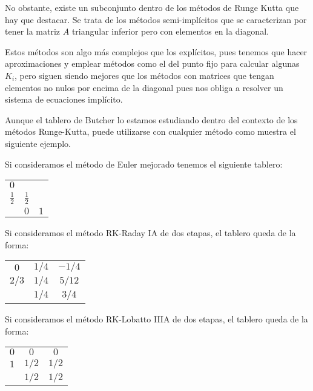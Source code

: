 No obstante, existe un subconjunto dentro de los métodos de Runge Kutta que hay que destacar. Se trata de los métodos semi-implícitos que se caracterizan por tener la matriz $A$ triangular inferior pero con elementos en la diagonal.

Estos métodos son algo más complejos que los explícitos, pues tenemos que hacer aproximaciones y emplear métodos como el del punto fijo para calcular algunas $K_i$, pero siguen siendo mejores que los métodos con matrices que tengan elementos no nulos por encima de la diagonal pues nos obliga a resolver un sistema de ecuaciones implícito.

Aunque el tablero de Butcher lo estamos estudiando dentro del contexto de los métodos Runge-Kutta, puede utilizarse con cualquier método como muestra el siguiente ejemplo.

\begin{example}
Si consideramos el método de Euler mejorado tenemos el siguiente tablero:

\begin{center}
\begin{tabular}{c|cc}
$0$ & & \\
$\frac{1}{2}$ & $\frac{1}{2}$ & \\
\hline
 & $0$ & $1$\\
\end{tabular}
\end{center}
\end{example}

\begin{example}
Si consideramos el método RK-Raday IA de dos etapas, el tablero queda de la forma:

\begin{center}
\begin{tabular}{c|cc}
$0$ & $1/4$ & $-1/4$\\
$2/3$ & $1/4 $ & $5/12$ \\
\hline
 & $1/4$ & $3/4$\\
\end{tabular}
\end{center}
\end{example}

\begin{example}
Si consideramos el método RK-Lobatto IIIA de dos etapas, el tablero queda de la forma:

\begin{center}
\begin{tabular}{c|cc}
$0$ & $0$ & $0$\\
$1$ & $1/2 $ & $1/2$ \\
\hline
 & $1/2$ & $1/2$\\
\end{tabular}
\end{center}
\end{example}

